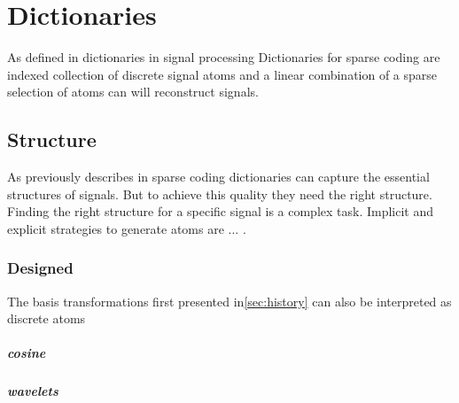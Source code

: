 \chapter{Dictionaries}

As defined in\label{sec:dicts} dictionaries in signal processing  
Dictionaries for sparse coding are indexed collection of discrete signal atoms
and a linear combination of a sparse selection of atoms can will reconstruct
signals.

\section{Structure}
As previously describes in\label{sec:dicts} sparse coding dictionaries can
capture the essential structures of signals. But to achieve this quality they
need the right structure. Finding the right structure for a specific signal is a
complex task. Implicit and explicit strategies to generate atoms are ... .

\subsection{Designed}
The basis transformations first presented in\ref{sec:history} can also
be interpreted as discrete atoms 

\paragraph{cosine}


\paragraph{wavelets}

